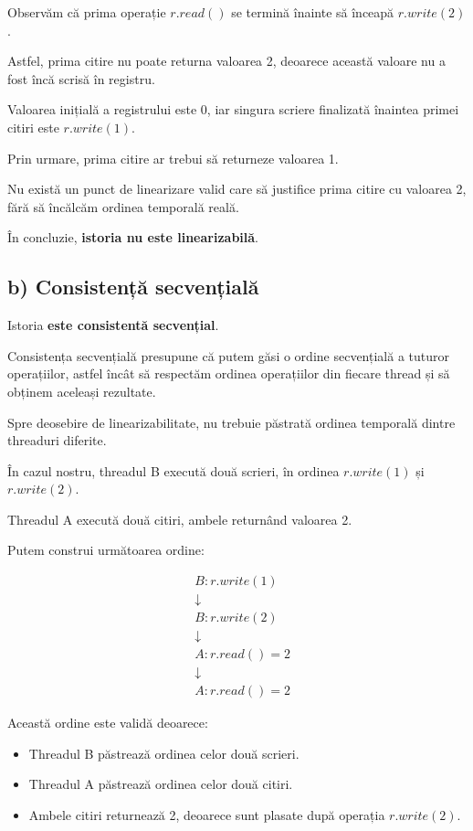 \documentclass[12pt,a4paper]{article}
\begin{document}
Observăm că prima operație $r.read()$
se termină înainte să înceapă $r.write(2)$.

Astfel, prima citire nu poate returna valoarea
2, deoarece această valoare nu a fost încă
scrisă în registru.

Valoarea inițială a registrului este 0,
iar singura scriere finalizată înaintea
primei citiri este $r.write(1)$.

Prin urmare, prima citire ar trebui să
returneze valoarea 1.

Nu există un punct de linearizare valid
care să justifice prima citire cu valoarea 2,
fără să încălcăm ordinea temporală reală.

În concluzie, \textbf{istoria nu este linearizabilă}.

\subsection*{b) Consistență secvențială}

Istoria \textbf{este consistentă secvențial}.

Consistența secvențială presupune că putem
găsi o ordine secvențială a tuturor
operațiilor, astfel încât să respectăm
ordinea operațiilor din fiecare thread
și să obținem aceleași rezultate.

Spre deosebire de linearizabilitate,
nu trebuie păstrată ordinea temporală
dintre threaduri diferite.

În cazul nostru, threadul B execută
două scrieri, în ordinea $r.write(1)$
și $r.write(2)$.

Threadul A execută două citiri,
ambele returnând valoarea 2.

Putem construi următoarea ordine:

\[
\begin{aligned}
&B:r.write(1)\\
&\downarrow\\
&B:r.write(2)\\
&\downarrow\\
&A:r.read() = 2\\
&\downarrow\\
&A:r.read() = 2
\end{aligned}
\]

Această ordine este validă deoarece:

\begin{itemize}
    \item Threadul B păstrează ordinea
    celor două scrieri.
    \item Threadul A păstrează ordinea
    celor două citiri.
    \item Ambele citiri returnează 2,
    deoarece sunt plasate după
    operația $r.write(2)$.
\end{itemize}
\end{document}
